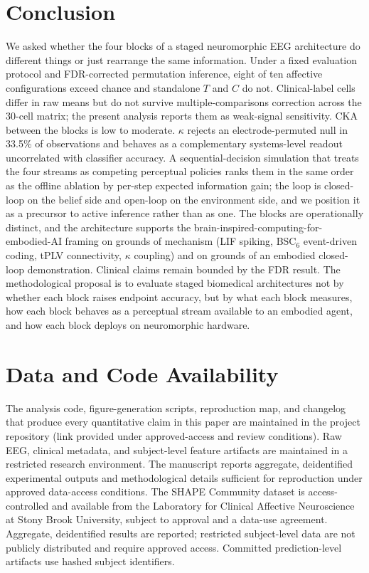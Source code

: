 \documentclass[journal]{IEEEtran}
\begin{document}
\section{Conclusion}
We asked whether the four blocks of a staged neuromorphic EEG architecture do different things or just rearrange the same information. Under a fixed evaluation protocol and FDR-corrected permutation inference, eight of ten affective configurations exceed chance and standalone $T$ and $C$ do not. Clinical-label cells differ in raw means but do not survive multiple-comparisons correction across the 30-cell matrix; the present analysis reports them as weak-signal sensitivity. CKA between the blocks is low to moderate. $\kappa$ rejects an electrode-permuted null in 33.5\% of observations and behaves as a complementary systems-level readout uncorrelated with classifier accuracy. A sequential-decision simulation that treats the four streams as competing perceptual policies ranks them in the same order as the offline ablation by per-step expected information gain; the loop is closed-loop on the belief side and open-loop on the environment side, and we position it as a precursor to active inference rather than as one. The blocks are operationally distinct, and the architecture supports the brain-inspired-computing-for-embodied-AI framing on grounds of mechanism (LIF spiking, BSC$_6$ event-driven coding, tPLV connectivity, $\kappa$ coupling) and on grounds of an embodied closed-loop demonstration. Clinical claims remain bounded by the FDR result. The methodological proposal is to evaluate staged biomedical architectures not by whether each block raises endpoint accuracy, but by what each block measures, how each block behaves as a perceptual stream available to an embodied agent, and how each block deploys on neuromorphic hardware.

\section*{Data and Code Availability}
The analysis code, figure-generation scripts, reproduction map, and changelog that produce every quantitative claim in this paper are maintained in the project repository (link provided under approved-access and review conditions). Raw EEG, clinical metadata, and subject-level feature artifacts are maintained in a restricted research environment. The manuscript reports aggregate, deidentified experimental outputs and methodological details sufficient for reproduction under approved data-access conditions. The SHAPE Community dataset is access-controlled and available from the Laboratory for Clinical Affective Neuroscience at Stony Brook University, subject to approval and a data-use agreement. Aggregate, deidentified results are reported; restricted subject-level data are not publicly distributed and require approved access. Committed prediction-level artifacts use hashed subject identifiers.
\end{document}
